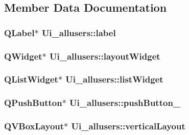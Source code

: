 \subsection{Member Data Documentation}
\hypertarget{classUi__allusers_a77698621774f8d4f5ead89152e68c7c5}{
\subsubsection[{label}]{\setlength{\rightskip}{0pt plus 5cm}Q\-Label$\ast$ Ui\-\_\-allusers\-::label}}\label{classUi__allusers_a77698621774f8d4f5ead89152e68c7c5}
\hypertarget{classUi__allusers_ab16d5587d6529c6bc5933570609bc503}{
\subsubsection[{layout\-Widget}]{\setlength{\rightskip}{0pt plus 5cm}Q\-Widget$\ast$ Ui\-\_\-allusers\-::layout\-Widget}}\label{classUi__allusers_ab16d5587d6529c6bc5933570609bc503}
\hypertarget{classUi__allusers_a19af6dca5907b7aad30005afc80ecd02}{
\subsubsection[{list\-Widget}]{\setlength{\rightskip}{0pt plus 5cm}Q\-List\-Widget$\ast$ Ui\-\_\-allusers\-::list\-Widget}}\label{classUi__allusers_a19af6dca5907b7aad30005afc80ecd02}
\hypertarget{classUi__allusers_aa6aaa6433d7716486876f51370000b4b}{
\subsubsection[{push\-Button\-\_\-2}]{\setlength{\rightskip}{0pt plus 5cm}Q\-Push\-Button$\ast$ Ui\-\_\-allusers\-::push\-Button\-\_}}\label{classUi__allusers_aa6aaa6433d7716486876f51370000b4b}
\hypertarget{classUi__allusers_afafbf73b9620fdf70831393f9820cf9b}{
\subsubsection[{vertical\-Layout}]{\setlength{\rightskip}{0pt plus 5cm}Q\-V\-Box\-Layout$\ast$ Ui\-\_\-allusers\-::vertical\-Layout}}\label{classUi__allusers_afafbf73b9620fdf70831393f9820cf9b}
